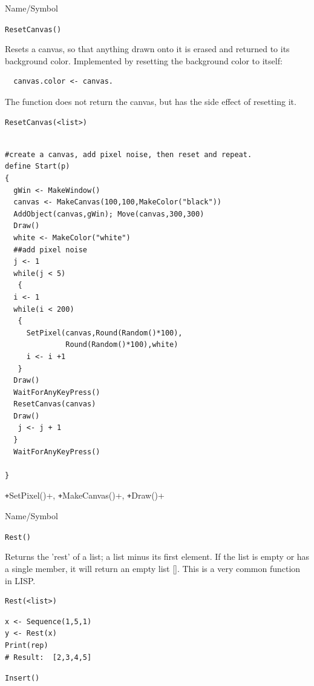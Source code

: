 \begin{desc}{Name/Symbol}
\item[Name/Symbol]  \verb+ResetCanvas()+

\item[Description]  Resets a canvas, so that anything drawn onto it is
  erased and returned to its background color.  Implemented by
  resetting the background color to itself: 
\begin{verbatim}
  canvas.color <- canvas. 
\end{verbatim}
 The function does not return the canvas,
  but has the side effect of resetting it.


\item[Usage]        	
\begin{verbatim}
ResetCanvas(<list>)
\end{verbatim}
			  
\item[Example]     	
\begin{verbatim}

#create a canvas, add pixel noise, then reset and repeat.
define Start(p)
{
  gWin <- MakeWindow()
  canvas <- MakeCanvas(100,100,MakeColor("black"))
  AddObject(canvas,gWin); Move(canvas,300,300)
  Draw()
  white <- MakeColor("white")
  ##add pixel noise
  j <- 1
  while(j < 5)
   {
  i <- 1
  while(i < 200)
   {
     SetPixel(canvas,Round(Random()*100),
              Round(Random()*100),white)
     i <- i +1 
   }
  Draw()
  WaitForAnyKeyPress()
  ResetCanvas(canvas)
  Draw()
   j <- j + 1
  }
  WaitForAnyKeyPress()

}
\end{verbatim}

\item[See Also]	
\texttt+SetPixel()+, \texttt+MakeCanvas()+, \texttt+Draw()+
\end{desc}


\begin{desc}{Name/Symbol}
\item[Name/Symbol]  \verb+Rest()+

\item[Description]  Returns the 'rest' of a list; a list minus its
  first element.  If the list is empty or has a single member, it will
  return an empty list [].  This is a very common function in LISP.

\item[Usage]        	
\begin{verbatim}
Rest(<list>)
\end{verbatim}
			  
\item[Example]     	
\begin{verbatim}
x <- Sequence(1,5,1)
y <- Rest(x)
Print(rep)
# Result:  [2,3,4,5]
\end{verbatim}

\item[See Also]	
\verb+Insert()+
\end{desc}

